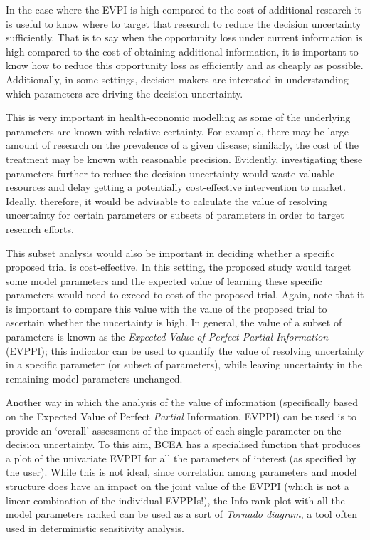 \documentclass[]{article}
\begin{document}
In the case where the EVPI is high compared to the cost of additional
research it is useful to know where to target that research to reduce
the decision uncertainty sufficiently. That is to say when the
opportunity loss under current information is high compared to the cost
of obtaining additional information, it is important to know how to
reduce this opportunity loss as efficiently and as cheaply as possible.
Additionally, in some settings, decision makers are interested in
understanding which parameters are driving the decision uncertainty.

This is very important in health-economic modelling as some of the
underlying parameters are known with relative certainty. For example,
there may be large amount of research on the prevalence of a given
disease; similarly, the cost of the treatment may be known with
reasonable precision. Evidently, investigating these parameters further
to reduce the decision uncertainty would waste valuable resources and
delay getting a potentially cost-effective intervention to market.
Ideally, therefore, it would be advisable to calculate the value of
resolving uncertainty for certain parameters or subsets of parameters in
order to target research efforts.

This subset analysis would also be important in deciding whether a
specific proposed trial is cost-effective. In this setting, the proposed
study would target some model parameters and the expected value of
learning these specific parameters would need to exceed to cost of the
proposed trial. Again, note that it is important to compare this value
with the value of the proposed trial to ascertain whether the
uncertainty is high. In general, the value of a subset of parameters is
known as the \emph{Expected Value of Perfect Partial Information}
(EVPPI); this indicator can be used to quantify the value of resolving
uncertainty in a specific parameter (or subset of parameters), while
leaving uncertainty in the remaining model parameters unchanged.

Another way in which the analysis of the value of information
(specifically based on the Expected Value of Perfect \emph{Partial}
Information, EVPPI) can be used is to provide an `overall' assessment of
the impact of each single parameter on the decision uncertainty. To this
aim, BCEA has a specialised function that produces a plot of the
univariate EVPPI for all the parameters of interest (as specified by the
user). While this is not ideal, since correlation among parameters and
model structure does have an impact on the joint value of the EVPPI
(which is not a linear combination of the individual EVPPIs!), the
Info-rank plot with all the model parameters ranked can be used as a
sort of \emph{Tornado diagram}, a tool often used in deterministic
sensitivity analysis.
\end{document}
